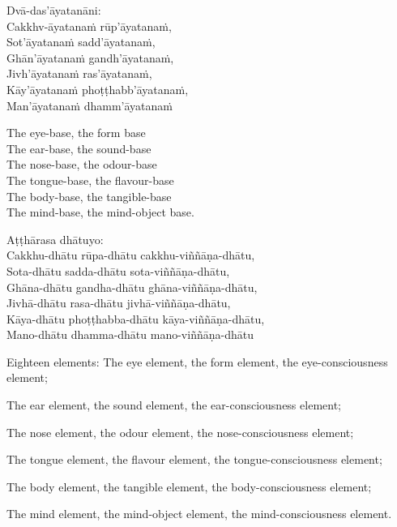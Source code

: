 \suttaRef{[MN 109]}

Dvā-das'āyatanāni:\\
Cakkhv-āyatanaṁ rūp'āyatanaṁ,\\
Sot'āyatanaṁ sadd'āyatanaṁ,\\
Ghān'āyatanaṁ gandh'āyatanaṁ,\\
Jivh'āyatanaṁ ras'āyatanaṁ,\\
Kāy'āyatanaṁ phoṭṭhabb'āyatanaṁ,\\
Man'āyatanaṁ dhamm'āyatanaṁ

\begin{english-verses}
  The eye-base, the form base\\
  The ear-base, the sound-base\\
  The nose-base, the odour-base\\
  The tongue-base, the flavour-base\\
  The body-base, the tangible-base\\
  The mind-base, the mind-object base.
\end{english-verses}

\suttaRef{[MN 148]}

Aṭṭhārasa dhātuyo:\\
Cakkhu-dhātu rūpa-dhātu cakkhu-viññāṇa-dhātu,\\
Sota-dhātu sadda-dhātu sota-viññāṇa-dhātu,\\
Ghāna-dhātu gandha-dhātu ghāna-viññāṇa-dhātu,\\
Jivhā-dhātu rasa-dhātu jivhā-viññāṇa-dhātu,\\
Kāya-dhātu phoṭṭhabba-dhātu kāya-viññāṇa-dhātu,\\
Mano-dhātu dhamma-dhātu mano-viññāṇa-dhātu

\begin{english-hang-verses}
  Eighteen elements: The eye element, the form element, the eye-consciousness element;
\end{english-hang-verses}
\begin{english-hangtogether-verses}
  The ear element, the sound element, the ear-consciousness element;\\
\end{english-hangtogether-verses}
\begin{english-hangtogether-verses}
  The nose element, the odour element, the nose-consciousness element;\\
\end{english-hangtogether-verses}
\begin{english-hangtogether-verses}
  The tongue element, the flavour element, the tongue-consciousness element;\\
\end{english-hangtogether-verses}
\begin{english-hangtogether-verses}
  The body element, the tangible element, the body-consciousness element;\\
\end{english-hangtogether-verses}
\begin{english-hangtogether-verses}
  The mind element, the mind-object element, the mind-consciousness element.
\end{english-hangtogether-verses}

